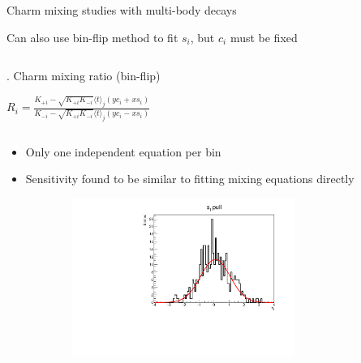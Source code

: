 \documentclass[xcolor={dvipsnames}]{beamer}
\begin{document}
\begin{frame}{Charm mixing studies with multi-body decays}
  \begin{center}
    {\large Can also use bin-flip method to fit $s_i$, but $c_i$ must be fixed}
  \end{center}
  \vspace{-0.2cm}
  \begin{columns}
    \begin{column}{0.65\textwidth}
      \begin{block}{. Charm mixing ratio (bin-flip)}
        \begin{center}
          $R_i = \frac{K_{+i} - \sqrt{K_{+i}K_{-i}}\langle t\rangle_j(yc_i + xs_i)}{K_{-i} - \sqrt{K_{+i}K_{-i}}\langle t\rangle_j(yc_i - xs_i)}$
        \end{center}
      \end{block}
    \end{column}
  \end{columns}
  \vspace{0.1cm}
  \begin{itemize}
    \item{Only one independent equation per bin}
    \item{Sensitivity found to be similar to fitting mixing equations directly}
  \end{itemize}
  \vspace{-0.2cm}
  \begin{figure}[htb]
    \centering
    \begin{subfigure}{0.5\textwidth}
      \centering
      \includegraphics[width=0.8\textwidth]{Plots/s_1_pull_binflip_hist.pdf}
    \end{subfigure}%
    \begin{subfigure}{0.5\textwidth}
      \centering

\end{subfigure}
\end{figure}
\end{frame}
\end{document}
